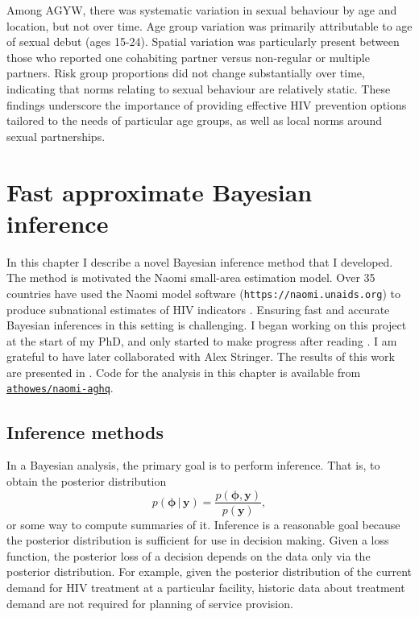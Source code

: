 \documentclass[a4paper, nobind]{templates/ociamthesis}
\begin{document}
Among AGYW, there was systematic variation in sexual behaviour by age and location, but not over time.
Age group variation was primarily attributable to age of sexual debut (ages 15-24).
Spatial variation was particularly present between those who reported one cohabiting partner versus non-regular or multiple partners.
Risk group proportions did not change substantially over time, indicating that norms relating to sexual behaviour are relatively static.
These findings underscore the importance of providing effective HIV prevention options tailored to the needs of particular age groups, as well as local norms around sexual partnerships.

\hypertarget{naomi-aghq}{%
\chapter{Fast approximate Bayesian inference}\label{naomi-aghq}}

\adjustmtc
{}

In this chapter I describe a novel Bayesian inference method that I developed.
The method is motivated the Naomi small-area estimation model.
Over 35 countries have used the Naomi model software (\texttt{https://naomi.unaids.org}) to produce subnational estimates of HIV indicators \autocite{unaids2023global}.
Ensuring fast and accurate Bayesian inferences in this setting is challenging.
I began working on this project at the start of my PhD, and only started to make progress after reading \textcite{stringer2021fast}.
I am grateful to have later collaborated with Alex Stringer.
The results of this work are presented in \textcite{howes2023fast}.
Code for the analysis in this chapter is available from \href{https://github.com/athowes/elgm-inf}{\texttt{athowes/naomi-aghq}}.

\hypertarget{inference-methods}{%
\section{Inference methods}\label{inference-methods}}

In a Bayesian analysis, the primary goal is to perform inference.
That is, to obtain the posterior distribution
\begin{equation}
p(\boldsymbol{\mathbf{\phi}} \, | \, \mathbf{y}) = \frac{p(\boldsymbol{\mathbf{\phi}}, \mathbf{y})}{p(\mathbf{y})},
\end{equation}
or some way to compute summaries of it.
Inference is a reasonable goal because the posterior distribution is sufficient for use in decision making.
Given a loss function, the posterior loss of a decision depends on the data only via the posterior distribution.
For example, given the posterior distribution of the current demand for HIV treatment at a particular facility, historic data about treatment demand are not required for planning of service provision.
\end{document}
